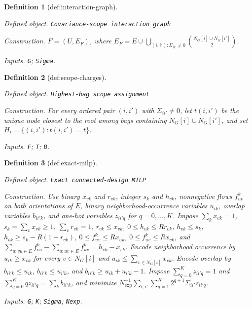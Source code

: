 \documentclass{article}
\newtheorem{definition}{Definition}
\begin{document}
\begin{definition}[def:interaction-graph]\label{def:interaction-graph}
\par\smallskip\noindent\emph{Defined object.} \texttt{Covariance-\allowbreak{}scope interaction graph}
\par\smallskip\noindent\emph{Construction.} \(F=(U,E_F)\), where \(E_F=E\cup\bigcup_{(i,i'):\Sigma_{ii'}\ne0}\binom{N_G[i]\cup N_G[i']}{2}\).
\par\smallskip\noindent\emph{Inputs.} \texttt{G}; \texttt{Sigma}.
\end{definition}

\begin{definition}[def:scope-charges]\label{def:scope-charges}
\par\smallskip\noindent\emph{Defined object.} \texttt{Highest-\allowbreak{}bag scope assignment}
\par\smallskip\noindent\emph{Construction.} For every ordered pair \((i,i')\) with \(\Sigma_{ii'}\ne0\), let \(t(i,i')\) be the unique node closest to the root among bags containing \(N_G[i]\cup N_G[i']\), and set \(H_t=\{(i,i'):t(i,i')=t\}\).
\par\smallskip\noindent\emph{Inputs.} \texttt{F}; \texttt{T}; \texttt{B}.
\end{definition}

\begin{definition}[def:exact-milp]\label{def:exact-milp}
\par\smallskip\noindent\emph{Defined object.} \texttt{Exact connected-\allowbreak{}design MILP}
\par\smallskip\noindent\emph{Construction.} Use binary \(x_{vk}\) and \(r_{vk}\), integer \(s_k\) and \(h_{vk}\), nonnegative flows \(f^k_{uv}\) on both orientations of \(E\), binary neighborhood-occurrence variables \(u_{ik}\), overlap variables \(b_{ii'k}\), and one-hot variables \(z_{ii'q}\) for \(q=0,\ldots,K\). Impose \(\sum_kx_{vk}=1\), \(s_k=\sum_vx_{vk}\ge1\), \(\sum_vr_{vk}=1\), \(r_{vk}\le x_{vk}\), \(0\le h_{vk}\le Rr_{vk}\), \(h_{vk}\le s_k\), \(h_{vk}\ge s_k-R(1-r_{vk})\), \(0\le f^k_{uv}\le Rx_{uk}\), \(0\le f^k_{uv}\le Rx_{vk}\), and \(\sum_{u:vu\in E}f^k_{vu}-\sum_{u:uv\in E}f^k_{uv}=h_{vk}-x_{vk}\). Encode neighborhood occurrence by \(u_{ik}\ge x_{vk}\) for every \(v\in N_G[i]\) and \(u_{ik}\le\sum_{v\in N_G[i]}x_{vk}\). Encode overlap by \(b_{ii'k}\le u_{ik}\), \(b_{ii'k}\le u_{i'k}\), and \(b_{ii'k}\ge u_{ik}+u_{i'k}-1\). Impose \(\sum_{q=0}^Kz_{ii'q}=1\) and \(\sum_{q=0}^Kqz_{ii'q}=\sum_kb_{ii'k}\), and minimize \(N_{\exp}^{-1}\sum_{i,i'}\sum_{q=1}^K2^{q+1}\Sigma_{ii'}z_{ii'q}\).
\par\smallskip\noindent\emph{Inputs.} \texttt{G}; \texttt{K}; \texttt{Sigma}; \texttt{Nexp}.
\end{definition}
\end{document}
